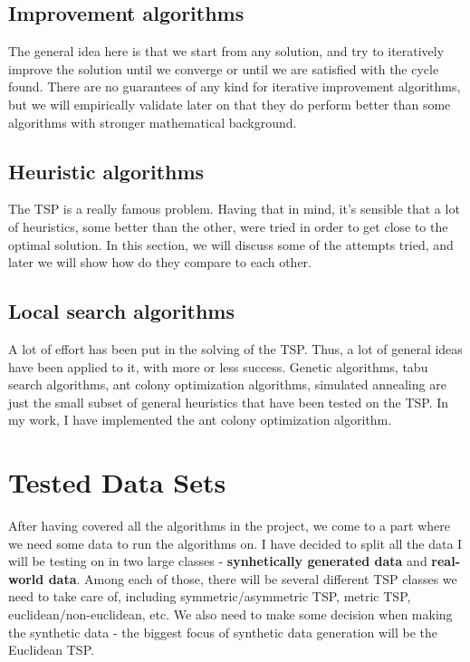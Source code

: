 \documentclass[12pt,twoside,notitlepage]{report}
\begin{document}
\subsection{Improvement algorithms}

The general idea here is that we start from any solution, and try to iteratively improve the solution until we converge or until we are satisfied with the cycle found. There are no guarantees of any kind for iterative improvement algorithms, but we will empirically validate later on that they do perform better than some algorithms with stronger mathematical background.

\subsection{Heuristic algorithms}

The TSP is a really famous problem. Having that in mind, it's sensible that a lot of heuristics, some better than the other, were tried in order to get close to the optimal solution. In this section, we will discuss some of the attempts tried, and later we will show how do they compare to each other.


\subsection{Local search algorithms}

A lot of effort has been put in the solving of the TSP. Thus, a lot of general ideas have been applied to it, with more or less success. Genetic algorithms, tabu search algorithms, ant colony optimization algorithms, simulated annealing are just the small subset of general heuristics that have been tested on the TSP. In my work, I have implemented the ant colony optimization algorithm.

\section{Tested Data Sets}

After having covered all the algorithms in the project, we come to a part where we need some data to run the algorithms on. I have decided to split all the data I will be testing on in two large classes - {\bf synhetically generated data} and {\bf real-world data}. Among each of those, there will be several different TSP classes we need to take care of, including symmetric/asymmetric TSP, metric TSP, euclidean/non-euclidean, etc. We also need to make some decision when making the synthetic data - the biggest focus of synthetic data generation will be the Euclidean TSP.
\end{document}
